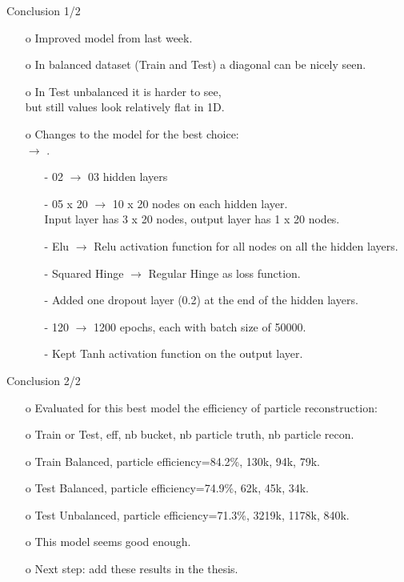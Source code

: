 \documentclass{beamer}
\begin{document}
\begin{frame}{Conclusion 1/2}
\begin{enumerate}
\item[o] Improved model from last week.
\item[o] In balanced dataset (Train and Test) a diagonal can be nicely seen.
\item[o] In Test unbalanced it is harder to see, \\ but still values look relatively flat in 1D. 
\item[o] Changes to the model for the best choice: \\ \texttt{} $\rightarrow$ \texttt{}.
\begin{enumerate}
\item[-] 02 $\rightarrow$ 03 hidden layers
\item[-] 05 x 20 $\rightarrow$ 10 x 20 nodes on each hidden layer. \\ Input layer has 3 x 20 nodes, output layer has 1 x 20 nodes.
\item[-] Elu $\rightarrow$ Relu activation function for all nodes on all the hidden layers. 
\item[-] Squared Hinge $\rightarrow$ Regular Hinge as loss function.
\item[-] Added one dropout layer (0.2) at the end of the hidden layers.
\item[-] 120 $\rightarrow$ 1200 epochs, each with batch size of 50000.
\item[-] Kept Tanh activation function on the output layer.
\end{enumerate}
\end{enumerate}
\end{frame}
\clearpage

\begin{frame}{Conclusion 2/2}
\begin{enumerate}
\item[o] Evaluated for this best model the efficiency of particle reconstruction:
\item[o] Train or Test, eff, nb bucket, nb particle truth, nb particle recon.
\item[o] Train Balanced, particle efficiency=84.2\%, 130k,  94k, 79k.
\item[o] Test Balanced, particle efficiency=74.9\%, 62k,  45k, 34k.
\item[o] Test Unbalanced, particle efficiency=71.3\%, 3219k,  1178k, 840k.
\item[o] This model seems good enough.
\item[o] Next step: add these results in the thesis. 
\end{enumerate}
\end{frame}
\clearpage
\end{document}
